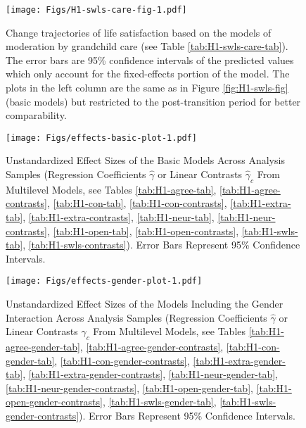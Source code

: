 \documentclass[
  english,
  man, noextraspace]{apa7}
\begin{document}
\begin{appendix}
\begin{figure}
\centering
\texttt{[image: Figs/H1-swls-care-fig-1.pdf]}
\caption{\label{fig:H1-swls-care-fig}Change trajectories of life satisfaction
based on the models of moderation by grandchild care (see Table
\ref{tab:H1-swls-care-tab}). The error bars are 95\% confidence
intervals of the predicted values which only account for the
fixed-effects portion of the model. The plots in the left column are the
same as in Figure \ref{fig:H1-swls-fig} (basic models) but restricted to
the post-transition period for better comparability.}
\end{figure}












\begin{figure}
\centering
\texttt{[image: Figs/effects-basic-plot-1.pdf]}
\caption{\label{fig:effects-basic-plot}Unstandardized Effect Sizes of the Basic
Models Across Analysis Samples (Regression Coefficients \(\hat{\gamma}\)
or Linear Contrasts \(\hat{\gamma}_{c}\) From Multilevel Models, see
Tables \ref{tab:H1-agree-tab}, \ref{tab:H1-agree-contrasts},
\ref{tab:H1-con-tab}, \ref{tab:H1-con-contrasts},
\ref{tab:H1-extra-tab}, \ref{tab:H1-extra-contrasts},
\ref{tab:H1-neur-tab}, \ref{tab:H1-neur-contrasts},
\ref{tab:H1-open-tab}, \ref{tab:H1-open-contrasts},
\ref{tab:H1-swls-tab}, \ref{tab:H1-swls-contrasts}). Error Bars
Represent 95\% Confidence Intervals.}
\end{figure}













\begin{figure}
\centering
\texttt{[image: Figs/effects-gender-plot-1.pdf]}
\caption{\label{fig:effects-gender-plot}Unstandardized Effect Sizes of the Models
Including the Gender Interaction Across Analysis Samples (Regression
Coefficients \(\hat{\gamma}\) or Linear Contrasts \(\hat{\gamma}_{c}\)
From Multilevel Models, see Tables \ref{tab:H1-agree-gender-tab},
\ref{tab:H1-agree-gender-contrasts}, \ref{tab:H1-con-gender-tab},
\ref{tab:H1-con-gender-contrasts}, \ref{tab:H1-extra-gender-tab},
\ref{tab:H1-extra-gender-contrasts}, \ref{tab:H1-neur-gender-tab},
\ref{tab:H1-neur-gender-contrasts}, \ref{tab:H1-open-gender-tab},
\ref{tab:H1-open-gender-contrasts}, \ref{tab:H1-swls-gender-tab},
\ref{tab:H1-swls-gender-contrasts}). Error Bars Represent 95\%
Confidence Intervals.}
\end{figure}


\end{appendix}
\end{document}

